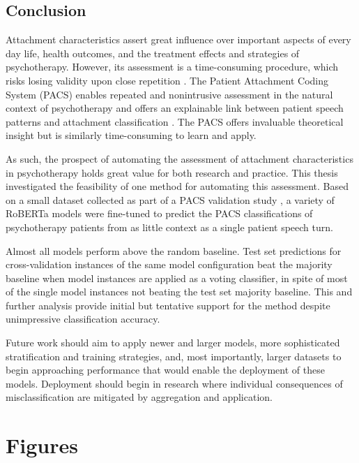 \documentclass[12pt]{report}
\begin{document}
\section{Conclusion}
Attachment characteristics assert great influence over important aspects of every day life, health outcomes, and the treatment effects and strategies of psychotherapy.
However, its assessment is a time-consuming procedure, which risks losing validity upon close repetition \cite{Daniel2015,Hesse1999}.
The Patient Attachment Coding System (PACS) enables repeated and nonintrusive assessment in the natural context of psychotherapy and offers an explainable link between patient speech patterns and attachment classification \cite{Talia2017,Talia2014}.
The PACS offers invaluable theoretical insight but is similarly time-consuming to learn and apply.

As such, the prospect of automating the assessment of attachment characteristics in psychotherapy holds great value for both research and practice.
This thesis investigated the feasibility of one method for automating this assessment.
Based on a small dataset collected as part of a PACS validation study \cite{Talia2017}, a variety of RoBERTa models \cite{roberta} were fine-tuned to predict the PACS classifications of psychotherapy patients from as little context as a single patient speech turn.

Almost all models perform above the random baseline.
Test set predictions for cross-validation instances of the same model configuration beat the majority baseline when model instances are applied as a voting classifier, in spite of most of the single model instances not beating the test set majority baseline.
This and further analysis provide initial but tentative support for the method despite unimpressive classification accuracy.

Future work should aim to apply newer and larger models, more sophisticated stratification and training strategies, and, most importantly, larger datasets to begin approaching performance that would enable the deployment of these models.
Deployment should begin in research where individual consequences of misclassification are mitigated by aggregation and application.



\appendix
\chapter{Figures}
\label{App: Figures}
\end{document}
